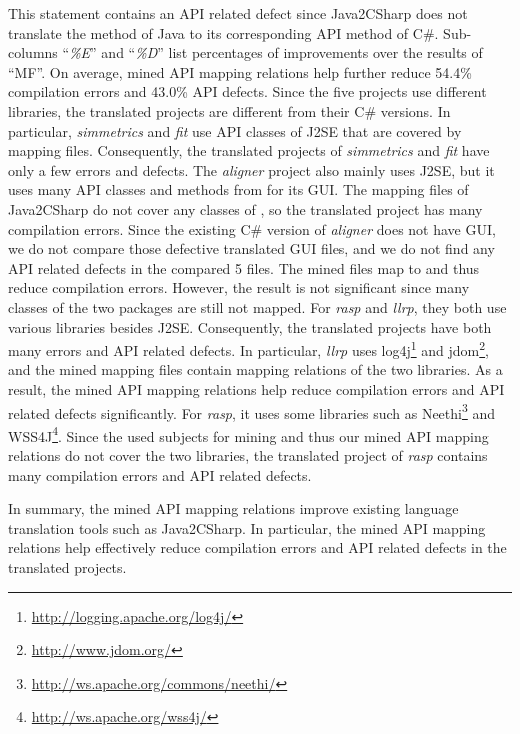 This statement contains an API related defect since Java2CSharp does not translate the  method of Java to its corresponding API method of C\#. Sub-columns ``\emph{\%E}'' and ``\emph{\%D}'' list
percentages of improvements over the results of ``MF''. On average,
mined API mapping relations help further reduce 54.4\% compilation errors
and 43.0\% API defects. Since the five projects use different libraries,
the translated projects are different from their C\# versions. In particular,
\emph{simmetrics} and \emph{fit} use API classes of J2SE that are
covered by mapping files. Consequently, the translated projects of
\emph{simmetrics} and \emph{fit} have only a few errors and defects. The
\emph{aligner} project also mainly uses J2SE, but it uses many API
classes and methods from  for its GUI. The mapping
files of Java2CSharp do not cover any classes of ,
so the translated project has many compilation errors. Since the existing C\#
version of \emph{aligner} does not have GUI, we do not compare those
defective translated GUI files, and we do not find any API related defects in the compared 5 files. The mined
files map  to  and
thus reduce compilation errors. However, the result is not
significant since many classes of the two packages are still not
mapped. For \emph{rasp} and \emph{llrp}, they both use various
libraries besides J2SE. Consequently, the translated projects have
both many errors and API related defects. In particular, \emph{llrp} uses
log4j\footnote{\url{http://logging.apache.org/log4j/}} and
jdom\footnote{\url{http://www.jdom.org/}}, and the mined mapping
files contain mapping relations of the two libraries. As a result,
the mined API mapping relations help reduce compilation errors and
API related defects significantly. For \emph{rasp}, it uses some libraries such as
Neethi\footnote{\url{http://ws.apache.org/commons/neethi/}} and
WSS4J\footnote{\url{http://ws.apache.org/wss4j/}}. Since the used
subjects for mining and thus our mined API mapping relations do not cover the
two libraries, the translated project of \emph{rasp} contains many
compilation errors and API related defects.

In summary, the mined API mapping relations improve existing language
translation tools such as Java2CSharp. In particular, the mined API
mapping relations help effectively reduce compilation errors and
API related defects in the translated projects.

